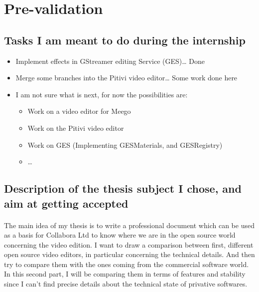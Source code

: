 \newpage
\section{Pre-validation}

\subsection{Tasks I am meant to do during the internship}

    \begin {itemize}
        \item {Implement effects in GStreamer editing Service (GES)\ldots
               Done}
        \item {Merge some branches into the Pitivi video editor\ldots
               Some work done here}
        \item {I am not sure what is next, for now the possibilities are:}
        \begin {itemize}
            \item {Work on a video editor for Meego}
            \item {Work on the Pitivi video editor}
            \item {Work on GES (Implementing GESMaterials, and GESRegistry)}
            \item {\ldots}
        \end {itemize}
    \end {itemize}

\subsection{Description of the thesis subject I chose, and aim at getting
            accepted}

  \paragraph{}
      The main idea of my thesis is to write a professional document which can
      be used as a basis for Collabora Ltd to know where we are in the open
      source world concerning the video edition. I want to draw a comparison
      between first, different open source video editors, in particular concerning the
      technical details. And then try to compare them with the ones coming
      from the commercial software world. In this second part, I will be
      comparing them in terms of features and stability since I can't
      find precise details about the technical state of privative softwares.

